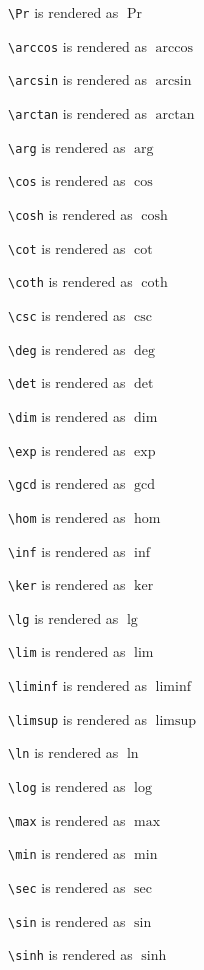 \texttt{\textbackslash Pr} is rendered as $\Pr$

\texttt{\textbackslash arccos} is rendered as $\arccos$

\texttt{\textbackslash arcsin} is rendered as $\arcsin$

\texttt{\textbackslash arctan} is rendered as $\arctan$

\texttt{\textbackslash arg} is rendered as $\arg$

\texttt{\textbackslash cos} is rendered as $\cos$

\texttt{\textbackslash cosh} is rendered as $\cosh$

\texttt{\textbackslash cot} is rendered as $\cot$

\texttt{\textbackslash coth} is rendered as $\coth$

\texttt{\textbackslash csc} is rendered as $\csc$

\texttt{\textbackslash deg} is rendered as $\deg$

\texttt{\textbackslash det} is rendered as $\det$

\texttt{\textbackslash dim} is rendered as $\dim$

\texttt{\textbackslash exp} is rendered as $\exp$

\texttt{\textbackslash gcd} is rendered as $\gcd$

\texttt{\textbackslash hom} is rendered as $\hom$

\texttt{\textbackslash inf} is rendered as $\inf$

\texttt{\textbackslash ker} is rendered as $\ker$

\texttt{\textbackslash lg} is rendered as $\lg$

\texttt{\textbackslash lim} is rendered as $\lim$

\texttt{\textbackslash liminf} is rendered as $\liminf$

\texttt{\textbackslash limsup} is rendered as $\limsup$

\texttt{\textbackslash ln} is rendered as $\ln$

\texttt{\textbackslash log} is rendered as $\log$

\texttt{\textbackslash max} is rendered as $\max$

\texttt{\textbackslash min} is rendered as $\min$

\texttt{\textbackslash sec} is rendered as $\sec$

\texttt{\textbackslash sin} is rendered as $\sin$

\texttt{\textbackslash sinh} is rendered as $\sinh$


